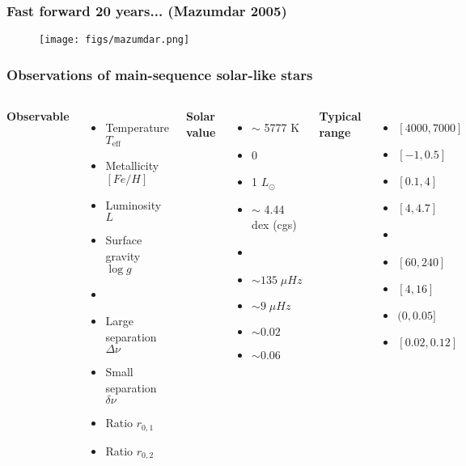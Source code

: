 \documentclass[10pt, compress]{beamer}
\begin{document}
\begin{frame}[fragile] \frametitle{Fast forward 20 years... (Mazumdar 2005)}
    \begin{figure}[!hb] 
        \centering
        \texttt{[image: figs/mazumdar.png]}
    \end{figure}
\end{frame}

\begin{frame}[fragile] \frametitle{Observations of main-sequence solar-like stars}
    \begin{columns}[t,onlytextwidth]
        \textbf{Observable}
        \begin{itemize}
            \item Temperature $T_{\text{eff}}$
            \item Metallicity $[Fe/H]$
            \item Luminosity $L$
            \item Surface gravity $\log g$
            \item[]
            \item Large separation $\Delta\nu$
            \item Small separation $\delta\nu$
            \item Ratio $r_{0,1}$
            \item Ratio $r_{0,2}$
        \end{itemize}

        \textbf{Solar value}
        \begin{itemize}
            \item[] $\sim$ 5777 K
            \item[] 0
            \item[] 1 $L_\odot$
            \item[] $\sim$ 4.44 dex (cgs)
            \item[] 
            \item[] $\sim 135 \; \mu Hz$
            \item[] $\sim 9 \; \mu Hz$
            \item[] $\sim 0.02$
            \item[] $\sim 0.06$
        \end{itemize}

        \textbf{Typical range}
        \begin{itemize}
            \item[] $[4000, 7000]$
            \item[] $[-1, 0.5]$
            \item[] $[0.1,4]$
            \item[] $[4,4.7]$
            \item[] 
            \item[] $[60,240]$
            \item[] $[4,16]$
            \item[] $(0,0.05]$
            \item[] $[0.02,0.12]$
        \end{itemize}
    \end{columns}
\end{frame}
\end{document}
